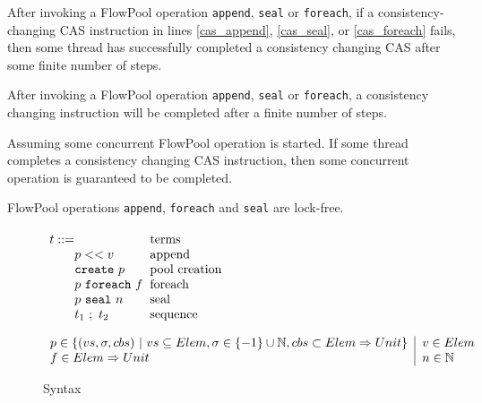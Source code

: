\documentclass[runningheads,a4paper]{llncs}
\newcommand{\gap}{\quad\quad}
\newcommand{\set}[1]{\{#1\}}
\newcommand{\ba}{\begin{array}}
\newcommand{\ea}{\end{array}}
\begin{document}
\begin{lemma}
After invoking a FlowPool operation \verb=append=, \verb=seal= or
\verb=foreach=, if a consistency-changing CAS instruction in lines
\ref{cas_append}, \ref{cas_seal}, or \ref{cas_foreach} fails, then some thread
has successfully completed a consistency changing CAS after some finite number
of steps.
\end{lemma}

\begin{lemma}
After invoking a FlowPool operation \verb=append=, \verb=seal= or
\verb=foreach=, a consistency changing instruction will be completed after 
a finite number of steps.
\end{lemma}

\begin{lemma}
Assuming some concurrent FlowPool operation is started. If some thread
completes a consistency changing CAS instruction, then some concurrent
operation is guaranteed to be completed.
\end{lemma}

\begin{theorem}
FlowPool operations \verb=append=, \verb=foreach= and \verb=seal= are lock-free.
\end{theorem}


\smallrulenames

\begin{figure}[t]


$\ba[t]{l@{\hspace{2mm}}l}
t    ::=                                                           & \mbox{terms}              \\
\gap p << v                                                  & \mbox{append}           \\
\gap \texttt{create}~p                                   & \mbox{pool creation}  \\
\gap p~\texttt{foreach}~f                             & \mbox{foreach}           \\
\gap p~\texttt{seal}~n                                  & \mbox{seal}                \\
\gap t_1~;~t_2                                               & \mbox{sequence}        \\
\ea$

$\ba{l@{\hspace{2mm}}|@{\hspace{2mm}}l@{\hspace{2mm}}l}
p \in \set{(vs, \sigma, cbs)~|~vs \subseteq Elem, \sigma \in \set{-1} \cup \mathbb{N}, cbs \subset Elem \Rightarrow Unit} & v \in Elem \\
f \in Elem \Rightarrow Unit & n \in \mathbb{N}
\ea$


\caption{Syntax}\label{fig:syntax}
\end{figure}
\end{document}
